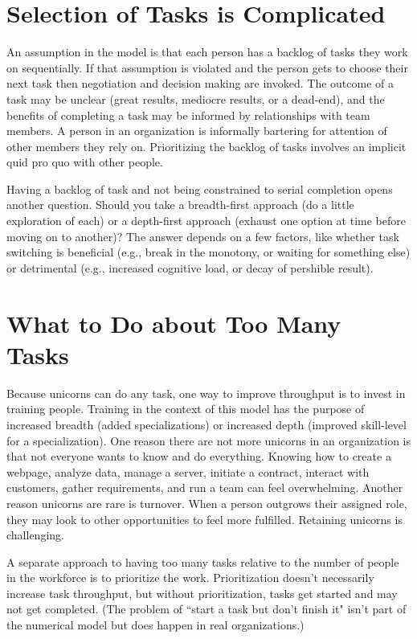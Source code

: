 \section{Selection of Tasks is Complicated}

An assumption in the model is that each person has a backlog of tasks they work on sequentially. If that assumption is violated and the person gets to choose their next task then negotiation and decision making are invoked. The outcome of a task may be unclear (great results, mediocre results, or a dead-end), and the benefits of completing a task may be informed by relationships with team members. A person in an organization is informally bartering for attention of other members they rely on. Prioritizing the backlog of tasks involves an implicit quid pro quo with other people. 

Having a backlog of task and not being constrained to serial completion opens another question. Should you take a breadth-first approach (do a little exploration of each) or a depth-first approach (exhaust one option at time before moving on to another)? The answer depends on a few factors, like whether task switching is beneficial (e.g., break in the monotony, or waiting for something else) or detrimental (e.g., increased cognitive load, or decay of pershible result). 

\section{What to Do about Too Many Tasks}


Because unicorns can do any task, one way to improve throughput is to invest in training people. Training in the context of this model has the purpose of  increased breadth (added specializations) or increased depth (improved skill-level for a specialization). One reason there are not more unicorns in an organization is that not everyone wants to know and do everything. Knowing how to create a webpage, analyze data, manage a server, initiate a contract, interact with customers, gather requirements, and run a team can feel overwhelming. Another reason unicorns are rare is turnover. When a person outgrows their assigned role,  they may look to other opportunities to feel more fulfilled. Retaining unicorns is challenging.

A separate approach to having too many tasks relative to the number of people in the workforce is to prioritize the work. Prioritization doesn't necessarily increase task throughput, but without prioritization, tasks get started and may not get completed. (The problem of ``start a task but don't finish it" isn't part of the numerical model but does happen in real organizations.)

